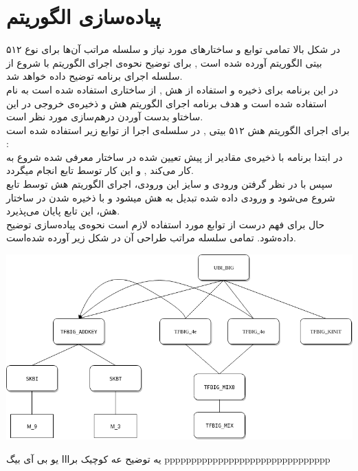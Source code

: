 \section{پیاده‌سازی الگوریتم}
در شکل بالا تمامی توابع و ساختارهای مورد نیاز  و سلسله مراتب آن‌ها برای نوع ۵۱۲ بیتی الگوریتم آورده شده است , برای توضیح نحوه‌ی اجرای الگوریتم با شروع از  
 سلسله اجرای برنامه توضیح داده خواهد شد.
\\
در این برنامه برای ‌ذخیره و استفاده از هش , از ساختاری استفاده شده است به نام \hyperref[subsec:sph-skein-big-context]{} استفاده شده است و هدف برنامه اجرای الگوریتم هش و ذخیره‌ی خروجی در این ساختاو بدست آوردن درهم‌سازی مورد نظر است.
\\
برای اجرای الگوریتم هش ۵۱۲ بیتی , در سلسله‌ی اجرا از توابع زیر استفاده شده است :
\\
در ابتدا برنامه با ذخیره‌ی مقادیر از پیش تعیین شده  \hyperref[subsec:IV512]{} در ساختار معرفی شده شروع به کار می‌کند , و این کار توسط تابع
\hyperref[subsec:sph-skein512-init]{}
   انجام میگردد.
  \\ سپس با در نظر گرفتن ورودی و سایز این ورودی، اجرای الگوریتم هش  توسط تابع \hyperref[subsec:sph-skein512]{}
   شروع می‌شود و ورودی داده شده تبدیل به هش میشود و با ذخیره شدن در ساختار  هش، این تابع پایان می‌پذیرد.
  \\ 
  حال برای فهم درست از توابع مورد استفاده لازم است نحوه‌ی پیاده‌سازی \hyperref[subsec:UBI-BIG]{} توضیح داده‌شود. تمامی سلسله مراتب طراحی آن در شکل زیر آورده شده‌است.
  \begin{center}
  		\includegraphics[width=16cm]{images/UBI.png}	
  \end{center}
  
یه توضیح عه کوچیک برااا یو بی آی بیگ   ppppppppppppppppppppppppppppppp

